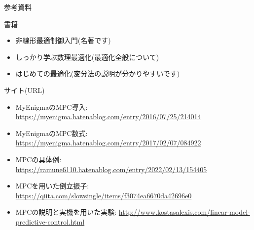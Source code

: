 \documentclass[dvipdfmx,12pt]{beamer}
\begin{document}
    \begin{frame}{参考資料}
        \footnotesize

        書籍\\
        \begin{itemize}
            \item 非線形最適制御入門(名著です)
            \item しっかり学ぶ数理最適化(最適化全般について)
            \item はじめての最適化(変分法の説明が分かりやすいです)
        \end{itemize}

        サイト(URL) \\
        \begin{itemize}
            \item MyEnigmaのMPC導入: \href{https://myenigma.hatenablog.com/entry/2016/07/25/214014}{https://myenigma.hatenablog.com/entry/2016/07/25/214014}
            \item MyEnigmaのMPC数式: \href{https://myenigma.hatenablog.com/entry/2017/02/07/084922}{https://myenigma.hatenablog.com/entry/2017/02/07/084922}
            \item MPCの具体例: \href{https://ramune6110.hatenablog.com/entry/2022/02/13/154405}{https://ramune6110.hatenablog.com/entry/2022/02/13/154405}
            \item MPCを用いた倒立振子: \href{https://qiita.com/slowsingle/items/f3074ea6670da42696e0}{https://qiita.com/slowsingle/items/f3074ea6670da42696e0}
            \item MPCの説明と実機を用いた実験: \href{http://www.kostasalexis.com/linear-model-predictive-control.html}{http://www.kostasalexis.com/linear-model-predictive-control.html}
        \end{itemize}
    \end{frame}
    
\end{document}
